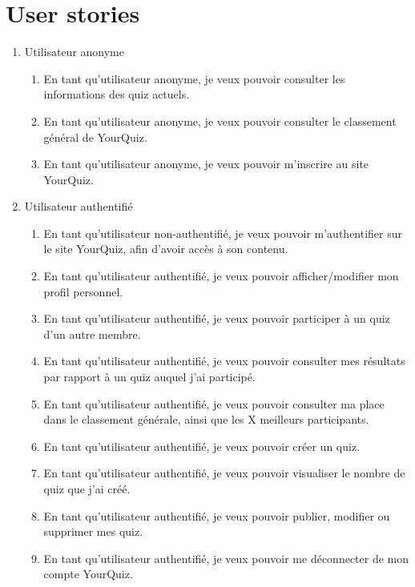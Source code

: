 \documentclass[a4paper, 12pt]{article}
\begin{document}
\section{User stories}
\begin{enumerate}
    \item Utilisateur anonyme
    \begin{enumerate}
        \item En tant qu'utilisateur anonyme, je veux pouvoir consulter les informations des quiz actuels.
        \item En tant qu'utilisateur anonyme, je veux pouvoir consulter le classement général de YourQuiz.
        \item En tant qu'utilisateur anonyme, je veux pouvoir m'inscrire au site YourQuiz.
    \end{enumerate}
    \item Utilisateur authentifié
    \begin{enumerate}
        \item En tant qu'utilisateur non-authentifié, je veux pouvoir m'authentifier sur le site YourQuiz, afin d'avoir accès à son contenu.
        \item En tant qu'utilisateur authentifié, je veux pouvoir afficher/modifier mon profil personnel.
        \item En tant qu'utilisateur authentifié, je veux pouvoir participer à un quiz d'un autre membre.
        \item En tant qu'utilisateur authentifié, je veux pouvoir consulter mes résultats par rapport à un quiz auquel j'ai participé.
        \item En tant qu'utilisateur authentifié, je veux pouvoir consulter ma place dans le classement générale, ainsi que les X meilleurs participants.
        \item En tant qu'utilisateur authentifié, je veux pouvoir créer un quiz.
        \item En tant qu'utilisateur authentifié, je veux pouvoir visualiser le nombre de quiz que j'ai créé.
        \item En tant qu'utilisateur authentifié, je veux pouvoir publier, modifier ou supprimer mes quiz.
        \item En tant qu'utilisateur authentifié, je veux pouvoir me déconnecter de mon compte YourQuiz.
    \end{enumerate}
\end{enumerate}

\newpage
\end{document}
